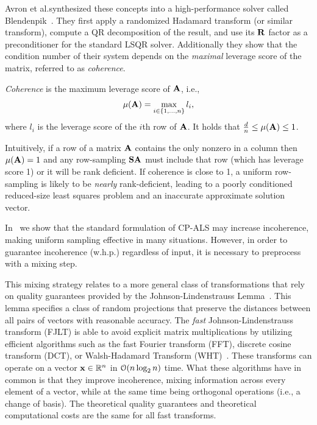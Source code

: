 Avron et al.\@ synthesized these concepts into a high-performance
solver called Blendenpik~\cite{blendenpik}. They first apply a
randomized Hadamard transform (or similar transform),
compute a QR decomposition of the result, and use its
$\M{R}$ factor as a preconditioner
for the standard LSQR solver. Additionally they show that the
condition number of their system depends on the \emph{maximal}
leverage score of the matrix, referred to as \emph{coherence}. 
\begin{definition}
\emph{Coherence} is  the maximum leverage score of $\M{A}$, i.e.,
\[ \mu(\M{A}) = \max_{i \in \{1,\dots,n\}} l_i, \]
where $l_i$ is the leverage score of the $i$th row of $\M{A}$. It
holds that $\frac{d}{n} \leq \mu(\M{A}) \leq 1$. 
\end{definition}
Intuitively, if a row of a matrix $\M{A}$ contains the only nonzero in a column then $\mu(\M{A})=1$ and any row-sampling $\M{SA}$ must include that row (which has leverage score 1) or it will be rank deficient. If coherence is close to 1, a uniform row-sampling is likely to be \emph{nearly} rank-deficient, leading to a poorly conditioned reduced-size least squares problem and an inaccurate approximate solution vector. 

In~\cite{caseyb} we show that the standard formulation of CP-ALS
may increase incoherence, making uniform sampling effective in many
situations. However, in order to guarantee incoherence (w.h.p.)
regardless of input, it is necessary to preprocess with a mixing step.  

This mixing strategy relates to a more general class of
transformations that rely on quality guarantees provided by the
Johnson-Lindenstrauss Lemma~\cite{jlt}. This lemma specifies a class
of random projections that preserve the distances between all pairs of
vectors with reasonable accuracy. The \emph{fast}
Johnson-Lindenstrauss transform (FJLT) is able to avoid explicit
matrix multiplications by utilizing efficient algorithms such as the
fast Fourier transform (FFT), discrete cosine transform (DCT), or
Walsh-Hadamard Transform (WHT)~\cite{fjlt}. These transforms can
operate on a vector $\V{x} \in \mathbb{R}^n$ in $\mathcal{O}({n\log_2 n})$
time. What these algorithms have in common is that
they improve incoherence, mixing information across every element of a vector, while at the
same time being orthogonal operations (i.e., a change of basis).  
The theoretical quality guarantees and theoretical computational costs are the same for all fast transforms.


